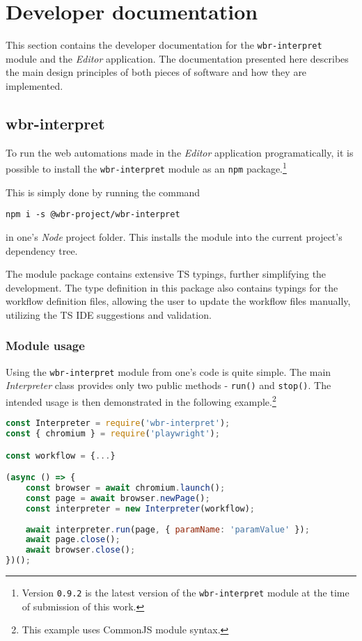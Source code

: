 \clearpage
\section{Developer documentation} \label{devDocs}

This section contains the developer documentation for the \texttt{wbr-interpret} module and the \textit{Editor} application.
The documentation presented here describes the main design principles of both pieces of software and how they are implemented.

\subsection{wbr-interpret}

To run the web automations made in the \textit{Editor} application programatically, 
it is possible to install the \texttt{wbr-interpret} module as an \texttt{npm} package.\footnote{Version \texttt{0.9.2} is the latest version of the \texttt{wbr-interpret} module at the time of submission of this work.}

This is simply done by running the command
\begin{center}
\verb|npm i -s @wbr-project/wbr-interpret|
\end{center}
in one's \textit{Node} project folder. 
This installs the module into the current project's dependency tree.

The module package contains extensive \acs{TS} typings, further simplifying the development.
The type definition in this package also contains typings for the workflow definition files, allowing the user to update the workflow files manually, 
utilizing the \acl{TS} \acs{IDE} suggestions and validation.

\subsubsection{Module usage}

Using the \texttt{wbr-interpret} module from one's code is quite simple.
The main \textit{Interpreter} class provides only two public methods - \texttt{run()} and \texttt{stop()}.
The intended usage is then demonstrated in the following example.\footnote{This example uses CommonJS module syntax.}

\begin{lstlisting}[language=javascript]
const Interpreter = require('wbr-interpret');
const { chromium } = require('playwright');

const workflow = {...}

(async () => {
    const browser = await chromium.launch();
    const page = await browser.newPage();
    const interpreter = new Interpreter(workflow);
    
    await interpreter.run(page, { paramName: 'paramValue' });
    await page.close();
    await browser.close();
})();
\end{lstlisting}

